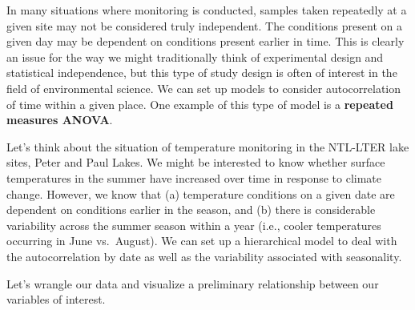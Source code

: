 \documentclass[]{article}
\newenvironment{Shaded}{\begin{snugshade}}{\end{snugshade}}
\newcommand{\KeywordTok}[1]{\textcolor[rgb]{0.13,0.29,0.53}{\textbf{#1}}}
\newcommand{\DataTypeTok}[1]{\textcolor[rgb]{0.13,0.29,0.53}{#1}}
\newcommand{\DecValTok}[1]{\textcolor[rgb]{0.00,0.00,0.81}{#1}}
\newcommand{\StringTok}[1]{\textcolor[rgb]{0.31,0.60,0.02}{#1}}
\newcommand{\CommentTok}[1]{\textcolor[rgb]{0.56,0.35,0.01}{\textit{#1}}}
\newcommand{\OperatorTok}[1]{\textcolor[rgb]{0.81,0.36,0.00}{\textbf{#1}}}
\newcommand{\NormalTok}[1]{#1}
\begin{document}
In many situations where monitoring is conducted, samples taken
repeatedly at a given site may not be considered truly independent. The
conditions present on a given day may be dependent on conditions present
earlier in time. This is clearly an issue for the way we might
traditionally think of experimental design and statistical independence,
but this type of study design is often of interest in the field of
environmental science. We can set up models to consider autocorrelation
of time within a given place. One example of this type of model is a
\textbf{repeated measures ANOVA}.

Let's think about the situation of temperature monitoring in the
NTL-LTER lake sites, Peter and Paul Lakes. We might be interested to
know whether surface temperatures in the summer have increased over time
in response to climate change. However, we know that (a) temperature
conditions on a given date are dependent on conditions earlier in the
season, and (b) there is considerable variability across the summer
season within a year (i.e., cooler temperatures occurring in June
vs.~August). We can set up a hierarchical model to deal with the
autocorrelation by date as well as the variability associated with
seasonality.

Let's wrangle our data and visualize a preliminary relationship between
our variables of interest.

\begin{Shaded}
\end{Shaded}
\end{document}
